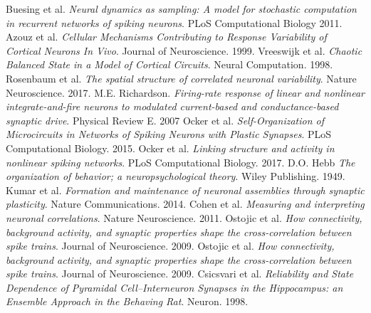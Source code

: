 \documentclass{ucetd}
\begin{document}

\makebibliography

\noindent [1] Buesing et al. \textit{Neural dynamics as sampling: A model for stochastic computation in recurrent networks of spiking neurons}.           PLoS Computational Biology 2011.
\newline
\noindent [2] Azouz et al. \textit{Cellular Mechanisms Contributing to Response Variability of Cortical Neurons In Vivo}. Journal of Neuroscience. 1999.
\newline
\noindent [3] Vreeswijk et al. \textit{Chaotic Balanced State in a Model of Cortical Circuits}. Neural Computation. 1998.
\newline
\noindent [4] Rosenbaum et al. \textit{The spatial structure of correlated neuronal variability}. Nature Neuroscience. 2017.
\newline
\noindent [5] M.E. Richardson. \textit{Firing-rate response of linear and nonlinear integrate-and-fire neurons to modulated current-based and conductance-based synaptic drive}. Physical Review E. 2007
\newline
\noindent [6] Ocker et al. \textit{Self-Organization of Microcircuits in Networks of Spiking Neurons with Plastic Synapses}. PLoS Computational Biology. 2015.
\newline
\noindent [7] Ocker et al. \textit{Linking structure and activity in nonlinear spiking networks}. PLoS Computational Biology. 2017.
\newline
\noindent [8] D.O. Hebb \textit{The organization of behavior; a neuropsychological theory}. Wiley Publishing. 1949.
\newline
\noindent [9] Kumar et al. \textit{Formation and maintenance of neuronal assemblies through synaptic plasticity}. Nature Communications. 2014.
\newline
\noindent [10] Cohen et al. \textit{Measuring and interpreting neuronal correlations}. Nature Neuroscience. 2011.
\newline
\noindent [11] Ostojic et al. \textit{How connectivity, background activity, and synaptic properties shape the cross-correlation between spike trains}. Journal of Neuroscience. 2009.
\newline
\noindent [12] Ostojic et al. \textit{How connectivity, background activity, and synaptic properties shape the cross-correlation between spike trains}. Journal of Neuroscience. 2009.
\newline
\noindent [13] Csicsvari et al. \textit{Reliability and State Dependence of Pyramidal Cell–Interneuron Synapses in the Hippocampus: an Ensemble Approach in the Behaving Rat}. Neuron. 1998.
\end{document}
